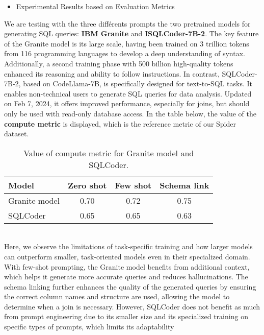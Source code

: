 \documentclass[12pt,a4paper]{article}
\begin{document}
  \begin{itemize}
  \item Experimental Results based on Evaluation Metrics
  \end{itemize}
  We are testing with the three différents prompts the two pretrained models for generating SQL queries: \textbf{IBM Granite} and \textbf{ISQLCoder-7B-2}.
The key feature of the Granite model is its large scale, having been trained on 3 trillion tokens from 116 programming languages to develop a deep understanding of syntax. Additionally, a second training phase with 500 billion high-quality tokens enhanced its reasoning and ability to follow instructions.
In contrast, SQLCoder-7B-2, based on CodeLlama-7B, is specifically designed for text-to-SQL tasks. It enables non-technical users to generate SQL queries for data analysis. Updated on Feb 7, 2024, it offers improved performance, especially for joins, but should only be used with read-only database access. In the table below, the value of the \textbf{compute metric} is displayed, which is the reference metric of our Spider dataset.\\

\begin{table}[h]
    \centering
    \small
    \begin{tabular}{|l|c|c|c|}
        \hline
        \textbf{Model} & \textbf{Zero shot} & \textbf{Few shot} & \textbf{Schema link} \\ \hline
        Granite model & 0.70 & 0.72 & 0.75 \\ \hline
        SQLCoder    & 0.65 & 0.65 & 0.63 \\ \hline
    \end{tabular}
    \caption{Value of compute metric for Granite model and SQLCoder.}
    \label{tab:evaluation_metrics}
\end{table}\\


Here, we observe the limitations of task-specific training and how larger models can outperform smaller, task-oriented models even in their specialized domain.
With few-shot prompting, the Granite model benefits from additional context, which helps it generate more accurate queries and reduces hallucinations. The schema linking further enhances the quality of the generated queries by ensuring the correct column names and structure are used, allowing the model to determine when a join is necessary.
However, SQLCoder does not benefit as much from prompt engineering due to its smaller size and its specialized training on specific types of prompts, which limits its adaptability
\end{document}
